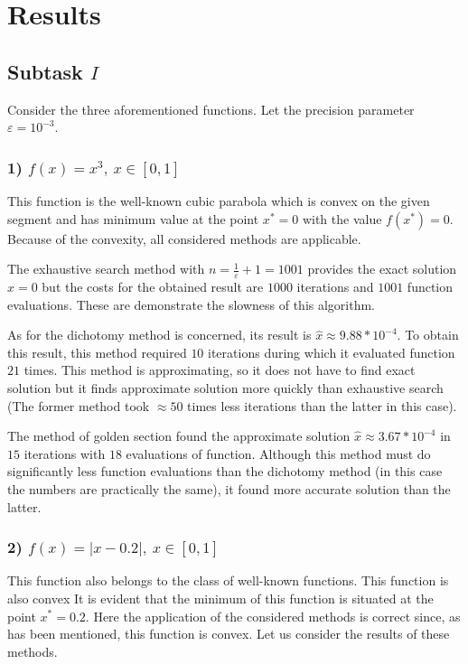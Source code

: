 \documentclass[12pt, bachelor, substylefile = algo_title.rtx]{disser}
\newcommand{\eps}{\varepsilon}
\theoremstyle{definition}
\begin{document}
\section{Results}

\subsection{Subtask $I$}
Consider the three aforementioned functions. Let the precision parameter $\eps = 10^{-3}$.
\subsubsection{1) $f(x) = x^3,\ x \in [0, 1]$}
This function is the well-known cubic parabola which is convex on the given segment and has minimum value at the point $x^* = 0$ with the value $f(x^*) = 0$. Because of the convexity, all considered methods are applicable. 

The exhaustive search method with $n = \frac{1}{\eps} + 1 = 1001$ provides the exact solution $\widehat{x} = 0$ but the costs for the obtained result are $1000$ iterations and $1001$ function evaluations. These are demonstrate the slowness of this algorithm.

As for the dichotomy method is concerned, its result is $\widehat{x} \approx 9.88*10^{-4}$. To obtain this result, this method required $10$ iterations during which it evaluated function $21$ times. This method is approximating, so it does not have to find exact solution but it finds approximate solution more quickly than exhaustive search (The former method took $\approx 50$ times less iterations than the latter in this case).

The method of golden section found the approximate solution $\widehat{x} \approx 3.67*10^{-4}$ in $15$ iterations with $18$ evaluations of function. Although this method must do significantly less function evaluations than the dichotomy method (in this case the numbers are practically the same), it found more accurate solution than the latter.

\subsubsection{2) $f(x) = |x-0.2|,\ x \in [0, 1]$}
This function also belongs to the class of well-known functions. This function is also convex It is evident that the minimum of this function is situated at the point $x^* = 0.2$. Here the application of the considered methods is correct since, as has been mentioned, this function is convex. Let us consider the results of these methods.
\end{document}
